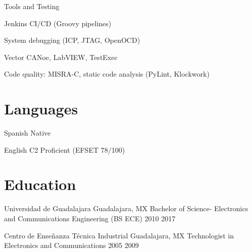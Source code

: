 \documentclass{resume} %
\begin{document}
\skillgroup
    {Tools and Testing}
    {
    \begin{itemize-bullets}
        \item{Jenkins CI/CD (Groovy pipelines)}
        \item{System debugging (ICP, JTAG, OpenOCD)}
        \item{Vector CANoe, LabVIEW, TestExec}
        \item{Code quality: MISRA-C, static code analysis (PyLint, Klockwork)}
        \end{itemize-bullets}
    }




\section{Languages}


\langitem
    {Spanish}
    {Native}


\langitem
    {English}
    {C2 Proficient (EFSET 78/100)}




\section{Education}


\eduitem
    {Universidad de Guadalajara}
    {Guadalajara, MX}
    {Bachelor of Science-  Electronics and Communications Engineering (BS ECE)}
    {2010}
    {2017}


\eduitem
    {Centro de Enseñanza Técnica Industrial}
    {Guadalajara, MX}
    {Technologist in Electronics and Communications}
    {2005}
    {2009}


\end{document}
